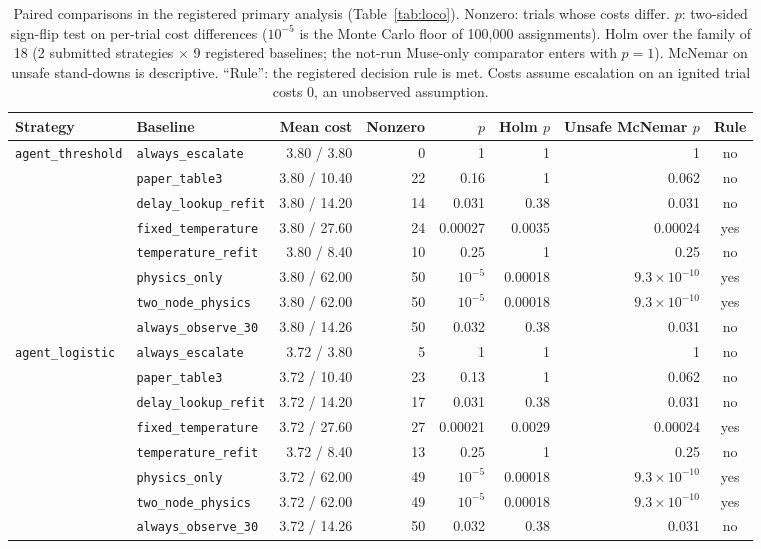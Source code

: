 \documentclass[11pt]{article}
\begin{document}
\begin{table}[t]
\centering\scriptsize
\caption{Paired comparisons in the registered primary analysis (Table~\ref{tab:loco}). Nonzero: trials whose costs
differ. $p$: two-sided sign-flip test on per-trial cost differences ($10^{-5}$ is the Monte Carlo floor of 100{,}000
assignments). Holm over the family of 18 (2 submitted strategies $\times$ 9 registered baselines; the not-run
Muse-only comparator enters with $p=1$). McNemar on unsafe stand-downs is descriptive. ``Rule'': the registered
decision rule is met. Costs assume escalation on an ignited trial costs 0, an unobserved assumption.}
\label{tab:pairs}
\setlength{\tabcolsep}{4pt}
\begin{tabular}{@{}llrrrrrc@{}}
\toprule
Strategy & Baseline & Mean cost & Nonzero & $p$ & Holm $p$ & Unsafe McNemar $p$ & Rule \\
\midrule
\texttt{agent\_threshold} & \texttt{always\_escalate} & 3.80 / 3.80 & 0 & 1 & 1 & 1 & no \\
 & \texttt{paper\_table3} & 3.80 / 10.40 & 22 & 0.16 & 1 & 0.062 & no \\
 & \texttt{delay\_lookup\_refit} & 3.80 / 14.20 & 14 & 0.031 & 0.38 & 0.031 & no \\
 & \texttt{fixed\_temperature} & 3.80 / 27.60 & 24 & 0.00027 & 0.0035 & 0.00024 & yes \\
 & \texttt{temperature\_refit} & 3.80 / 8.40 & 10 & 0.25 & 1 & 0.25 & no \\
 & \texttt{physics\_only} & 3.80 / 62.00 & 50 & $10^{-5}$ & 0.00018 & $9.3\times10^{-10}$ & yes \\
 & \texttt{two\_node\_physics} & 3.80 / 62.00 & 50 & $10^{-5}$ & 0.00018 & $9.3\times10^{-10}$ & yes \\
 & \texttt{always\_observe\_30} & 3.80 / 14.26 & 50 & 0.032 & 0.38 & 0.031 & no \\
\midrule
\texttt{agent\_logistic} & \texttt{always\_escalate} & 3.72 / 3.80 & 5 & 1 & 1 & 1 & no \\
 & \texttt{paper\_table3} & 3.72 / 10.40 & 23 & 0.13 & 1 & 0.062 & no \\
 & \texttt{delay\_lookup\_refit} & 3.72 / 14.20 & 17 & 0.031 & 0.38 & 0.031 & no \\
 & \texttt{fixed\_temperature} & 3.72 / 27.60 & 27 & 0.00021 & 0.0029 & 0.00024 & yes \\
 & \texttt{temperature\_refit} & 3.72 / 8.40 & 13 & 0.25 & 1 & 0.25 & no \\
 & \texttt{physics\_only} & 3.72 / 62.00 & 49 & $10^{-5}$ & 0.00018 & $9.3\times10^{-10}$ & yes \\
 & \texttt{two\_node\_physics} & 3.72 / 62.00 & 49 & $10^{-5}$ & 0.00018 & $9.3\times10^{-10}$ & yes \\
 & \texttt{always\_observe\_30} & 3.72 / 14.26 & 50 & 0.032 & 0.38 & 0.031 & no \\
\bottomrule
\end{tabular}
\end{table}
\end{document}
